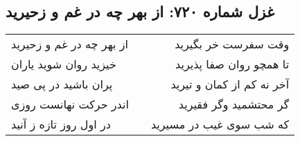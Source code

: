\begin{center}
\section*{غزل شماره ۷۲۰: از بهر چه در غم و زحیرید}
\label{sec:0720}
\begin{longtable}{l p{0.5cm} r}
از بهر چه در غم و زحیرید
&&
وقت سفرست خر بگیرید
\\
خیزید روان شوید یاران
&&
تا همچو روان صفا پذیرید
\\
پران باشید در پی صید
&&
آخر نه کم از کمان و تیرید
\\
اندر حرکت نهانست روزی
&&
گر محتشمید وگر فقیرید
\\
در اول روز تازه ز آنید
&&
که شب سوی غیب در مسیرید
\\
\end{longtable}
\end{center}
